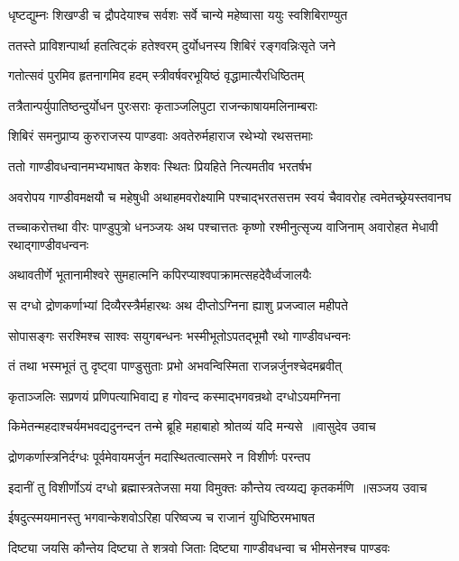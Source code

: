 \twolineshloka
{धृष्टद्युम्नः शिखण्डी च द्रौपदेयाश्च सर्वशः}
{सर्वे चान्ये महेष्वासा ययुः स्वशिबिराण्युत}


\twolineshloka
{ततस्ते प्राविशन्पार्था हतत्विट्कं हतेश्वरम्}
{दुर्योधनस्य शिबिरं रङ्गवन्निःसृते जने}


\twolineshloka
{गतोत्सवं पुरमिव हृतनागमिव हदम्}
{स्त्रीवर्षवरभूयिष्ठं वृद्धामात्यैरधिष्ठितम्}


\twolineshloka
{तत्रैतान्पर्युपातिष्ठन्दुर्योधन पुरःसराः}
{कृताञ्जलिपुटा राजन्काषायमलिनाम्बराः}


\twolineshloka
{शिबिरं समनुप्राप्य कुरुराजस्य पाण्डवाः}
{अवतेरुर्महाराज रथेभ्यो रथसत्तमाः}


\twolineshloka
{ततो गाण्डीवधन्वानमभ्यभाषत केशवः}
{स्थितः प्रियहिते नित्यमतीव भरतर्षभ}


\threelineshloka
{अवरोपय गाण्डीवमक्षयौ च महेषुधी}
{अथाहमवरोक्ष्यामि पश्चाद्भरतसत्तम}
{स्वयं चैवावरोह त्वमेतच्छ्रेयस्तवानघ}


तच्चाकरोत्तथा वीरः पाण्डुपुत्रो धनञ्जयः
\twolineshloka
{अथ पश्चात्ततः कृष्णो रश्मीनुत्सृज्य वाजिनाम्}
{अवारोहत मेधावी रथाद्गाण्डीवधन्वनः}


\twolineshloka
{अथावतीर्णे भूतानामीश्वरे सुमहात्मनि}
{कपिरप्याश्वपाक्रामत्सहदेवैर्ध्वजालयैः}


\twolineshloka
{स दग्धो द्रोणकर्णाभ्यां दिव्यैरस्त्रैर्महारथः}
{अथ दीप्तोऽग्निना ह्याशु प्रजज्वाल महीपते}


\twolineshloka
{सोपासङ्गः सरश्मिश्च साश्वः सयुगबन्धनः}
{भस्मीभूतोऽपतद्भूमौ रथो गाण्डीवधन्वनः}


\twolineshloka
{तं तथा भस्मभूतं तु दृष्ट्वा पाण्डुसुताः प्रभो}
{अभवन्विस्मिता राजन्नर्जुनश्चेदमब्रवीत्}


\twolineshloka
{कृताञ्जलिः सप्रणयं प्रणिपत्याभिवाद्य ह}
{गोवन्द कस्माद्भगवन्रथो दग्धोऽयमग्निना}


\threelineshloka
{किमेतन्महदाश्चर्यमभवद्यदुनन्दन}
{तन्मे ब्रूहि महाबाहो श्रोतव्यं यदि मन्यसे ॥वासुदेव उवाच}
{}


\twolineshloka
{द्रोणकर्णास्त्रनिर्दग्धः पूर्वमेवायमर्जुन}
{मदास्थितत्वात्समरे न विशीर्णः परन्तप}


\threelineshloka
{इदानीं तु विशीर्णोऽयं दग्धो ब्रह्मास्त्रतेजसा}
{मया विमुक्तः कौन्तेय त्वय्यद्य कृतकर्मणि ॥सञ्जय उवाच}
{}


\twolineshloka
{ईषदुत्स्मयमानस्तु भगवान्केशवोऽरिहा}
{परिष्वज्य च राजानं युधिष्ठिरमभाषत}


\twolineshloka
{दिष्ट्या जयसि कौन्तेय दिष्ट्या ते शत्रवो जिताः}
{दिष्ट्या गाण्डीवधन्वा च भीमसेनश्च पाण्डवः}


